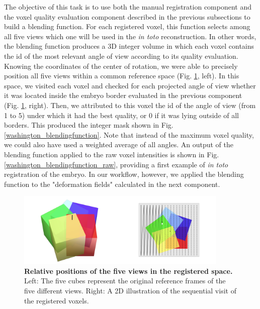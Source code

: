    The objective of this task is to use both the manual registration component and the voxel quality evaluation component described in the previous subsections to build a blending function. For each registered voxel, this function selects among all five views which one will be used in the \textit{in toto} reconstruction. In other words, the blending function produces a 3D integer volume in which each voxel contains the id of the most relevant angle of view according to its quality evaluation. Knowing the coordinates of the center of rotation, we were able to precisely position all five views within a common reference space (Fig. \ref{Reconstruction_5angles_3Dvolume}, left). In this space, we visited each voxel and checked for each projected angle of view whether it was located inside the embryo border evaluated in the previous component (Fig. \ref{Reconstruction_5angles_3Dvolume}, right). Then, we attributed to this voxel the id of the angle of view (from 1 to 5) under which it had the best quality, or 0 if it was lying outside of all borders. This produced the integer mask shown in Fig. \ref{washington_blendingfunction}. Note that instead of the maximum voxel quality, we could also have used a weighted average of all angles. An output of the blending function applied to the raw voxel intensities is shown in Fig. \ref{washington_blendingfunction_raw}, providing a first example of \textit{in toto} registration of the embryo. In our workflow, however, we applied the blending function to the "deformation fields" calculated in the next component.  
\begin{figure}
\begin{center}
\includegraphics[width=0.9\textwidth]{../../images/Reconstruction/5angles_fusion.png}
\end{center}
\caption{\textbf{Relative positions of the five views in the registered space.} Left: The five cubes represent the original reference frames of the five different views. Right: A 2D illustration of the sequential visit of the registered voxels.}
\label{Reconstruction_5angles_3Dvolume}
\end{figure}

